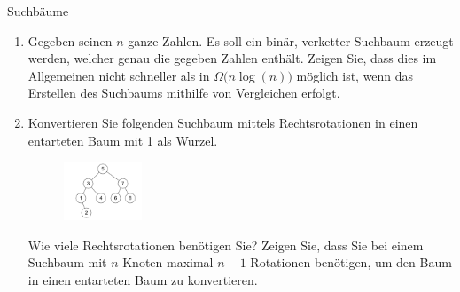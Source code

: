 \documentclass[11pt,a4paper]{article}
\begin{document}
\thispagestyle{empty}




\begin{aufgabe}{1}{Suchbäume}
    \begin{enumerate}
        \item Gegeben seinen $n$ ganze Zahlen.
        Es soll ein binär, verketter Suchbaum erzeugt werden, welcher genau die gegeben Zahlen enthält.
        Zeigen Sie, dass dies im Allgemeinen nicht schneller als in $\Omega\big(n \log(n)\big)$ möglich ist, wenn das Erstellen des Suchbaums mithilfe von Vergleichen erfolgt.
        \item Konvertieren Sie folgenden Suchbaum mittels Rechtsrotationen in einen entarteten Baum mit 1 als Wurzel.
        \begin{figure}[h!]
            \centering
            \includegraphics[width=0.22\textwidth]{img/1c}
        \end{figure}
        \FloatBarrier
        Wie viele Rechtsrotationen benötigen Sie?
        Zeigen Sie, dass Sie bei einem Suchbaum mit $n$ Knoten maximal $n - 1$ Rotationen benötigen, um den Baum in einen entarteten Baum zu konvertieren.
    \end{enumerate}
\end{aufgabe}
\end{document}
